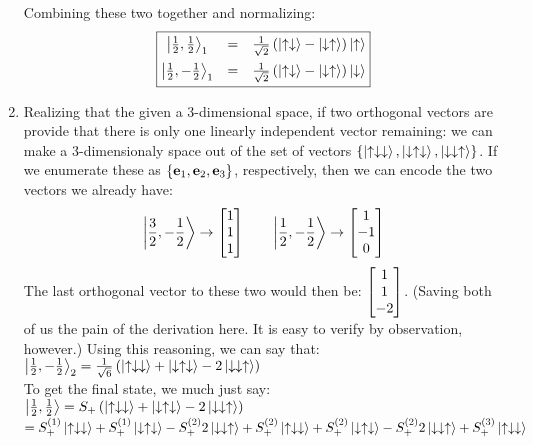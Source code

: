 \documentclass[12pt]{article}
\begin{document}
\begin{enumerate}[label=\alph*)]
Combining these two together and normalizing:
\[\boxed{\mqty{ \ket{\frac{1}{2}, \frac{1}{2}}_1 & = & \frac{1}{\sqrt{2}} \left(\ket{\uparrow\downarrow}-\ket{\downarrow\uparrow}\right)\ket{\uparrow}\vspace{0.5em}\\ \ket{\frac{1}{2}, -\frac{1}{2}}_1 & = & \frac{1}{\sqrt{2}}\left(\ket{\uparrow\downarrow}-\ket{\downarrow\uparrow}\right)\ket{\downarrow}}}\]

\item Realizing that the given a 3-dimensional space, if two orthogonal vectors are provide that there is only one linearly independent vector remaining: we can make a 3-dimensionaly space out of the set of vectors $\{\ket{\uparrow\downarrow\downarrow}, \ket{\downarrow\uparrow\downarrow}, \ket{\downarrow\downarrow\uparrow}\}$. If we enumerate these as $\{\vb{e}_1, \vb{e}_2, \vb{e}_3\}$, respectively, then we can encode the two vectors we already have:
\[\ket{\frac{3}{2}, -\frac{1}{2}}\rightarrow \mqty[1\\1\\1] \qquad \ket{\frac{1}{2}, -\frac{1}{2}}\rightarrow \mqty[1\\-1\\0]\]
The last orthogonal vector to these two would then be: $\mqty[1\\1\\-2]$. (Saving both of us the pain of the derivation here. It is easy to verify by observation, however.) Using this reasoning, we can say that:\vspace{0.5em}\\
$\ket{\frac{1}{2}, -\frac{1}{2}}_2 = \frac{1}{\sqrt{6}}\left(\ket{\uparrow\downarrow\downarrow} + \ket{\downarrow\uparrow\downarrow} - 2\ket{\downarrow\downarrow\uparrow}\right)$\vspace{0.5em}\\
To get the final state, we much just say:\vspace{0.5em}\\
$\ket{\frac{1}{2}, \frac{1}{2}} = S_+\left(\ket{\uparrow\downarrow\downarrow}+ \ket{\downarrow\uparrow\downarrow} -2\ket{\downarrow\downarrow\uparrow}\right)$\vspace{0.5em}\\
\hspace*{2.7em}$ = S_+^{(1)}\ket{\uparrow\downarrow\downarrow} + S_+^{(1)}\ket{\downarrow\uparrow\downarrow} - S_+^{(2)}2\ket{\downarrow\downarrow\uparrow} + S_+^{(2)}\ket{\uparrow\downarrow\downarrow}+S_+^{(2)}\ket{\downarrow\uparrow\downarrow}-S_+^{(2)}2\ket{\downarrow\downarrow\uparrow} + S_+^{(3)}\ket{\uparrow\downarrow\downarrow}$\vspace{0.5em}\\

\end{enumerate}
\end{document}
